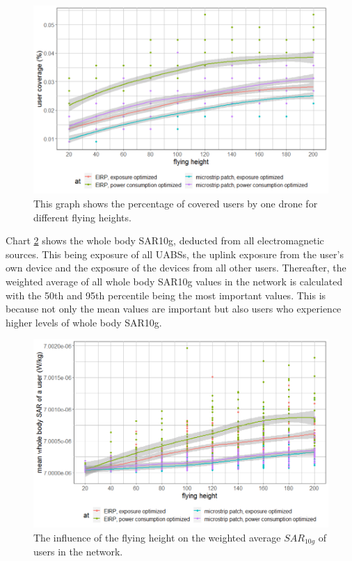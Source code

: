 \begin{figure}[h!]
  \includegraphics[width=\textwidth]{../results/s2/fhvscov.png}
  \caption{This graph shows the percentage of covered users by one drone for different flying heights.}
  \label{fig:s2fhvscov}
\end{figure}

Chart \ref{fig:s2fhvssar} shows the whole body SAR10g, deducted from all electromagnetic sources. This being exposure of all \gls{UABS}s,
 the uplink exposure from the user’s own device and the exposure of the devices from all other users. 
 Thereafter, the weighted average of all whole body SAR10g values in the network is calculated with the 50th and 95th percentile 
 being the most important values. This is because not only the mean values are important but also users who experience higher 
 levels of whole body SAR10g.


\begin{figure}[h!]
  \includegraphics[width=\textwidth]{../results/s2/fhvssar.png}
  \caption{The influence of the flying height on the weighted average $SAR_{10g}$ of users in the network.}
  \label{fig:s2fhvssar}
\end{figure}


